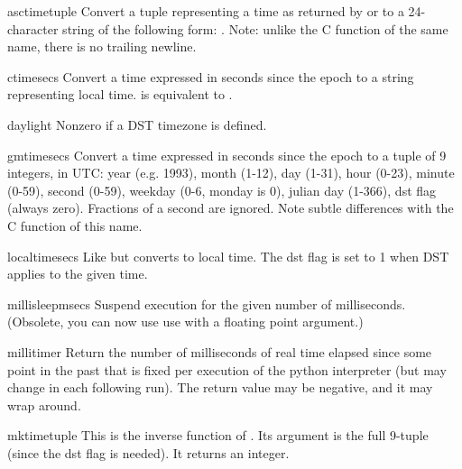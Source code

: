 \begin{funcdesc}{asctime}{tuple}
Convert a tuple representing a time as returned by  or
 to a 24-character string of the following form:
.  Note: unlike the C function of
the same name, there is no trailing newline.
\end{funcdesc}


\begin{funcdesc}{ctime}{secs}
Convert a time expressed in seconds since the epoch to a string
representing local time.   is equivalent to
.
\end{funcdesc}

\begin{datadesc}{daylight}
Nonzero if a DST timezone is defined.
\end{datadesc}

\begin{funcdesc}{gmtime}{secs}
Convert a time expressed in seconds since the epoch to a tuple of 9
integers, in UTC: year (e.g. 1993), month (1-12), day (1-31), hour
(0-23), minute (0-59), second (0-59), weekday (0-6, monday is 0),
julian day (1-366), dst flag (always zero).  Fractions of a second are
ignored.  Note subtle differences with the C function of this name.
\end{funcdesc}

\begin{funcdesc}{localtime}{secs}
Like  but converts to local time.  The dst flag is set
to 1 when DST applies to the given time.
\end{funcdesc}

\begin{funcdesc}{millisleep}{msecs}
Suspend execution for the given number of milliseconds.  (Obsolete,
you can now use use  with a floating point argument.)
\end{funcdesc}

\begin{funcdesc}{millitimer}{}
Return the number of milliseconds of real time elapsed since some
point in the past that is fixed per execution of the python
interpreter (but may change in each following run).  The return value
may be negative, and it may wrap around.
\end{funcdesc}

\begin{funcdesc}{mktime}{tuple}
This is the inverse function of .  Its argument is the
full 9-tuple (since the dst flag is needed).  It returns an integer.
\end{funcdesc}

